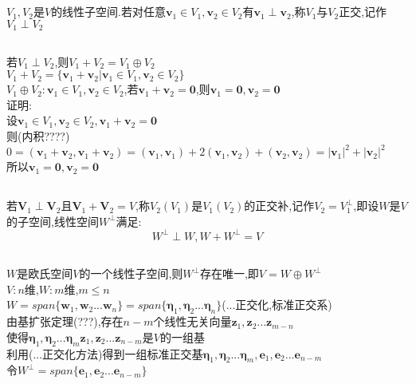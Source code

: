 \documentclass[11pt, a4paper, UTF8]{ctexart}
\begin{document}
\section{}
$V_1,V_2$是$V$的线性子空间.若对任意$\bm v_1\in V_1,\bm v_2\in V_2$有$\bm v_1\perp\bm v_2$,称$V_1$与$V_2$正交,记作$V_1\perp V_2$\\
\subsection{}
若$V_1\perp V_2$,则$V_1+V_2=V_1\oplus V_2$\\
$V_1+V_2=\{\bm v_1+\bm v_2|\bm v_1\in V_1,\bm v_2\in V_2\}$\\
$V_1\oplus V_2:\bm v_1\in V_1,\bm v_2\in V_2$,若$\bm v_1+\bm v_2=\bm0$,则$\bm v_1=\bm0,\bm v_2=\bm0$\\
证明:\\
设$\bm v_1\in V_1,\bm v_2\in V_2,\bm v_1+\bm v_2=\bm0$\\
则(内积????)$0=(\bm v_1+\bm v_2,\bm v_1+\bm v_2)=(\bm v_1,\bm v_1)+2(\bm v_1,\bm v_2)+(\bm v_2,\bm v_2)=|\bm v_1|^2+|\bm v_2|^2$\\
所以$\bm v_1=\bm0,\bm v_2=\bm0$\\
\subsection{}
若$\bm V_1\perp\bm V_2$且$\bm V_1+\bm V_2=V$,称$V_2(V_1)$是$V_1(V_2)$的正交补,记作$V_2=V_1^\perp$,即设$W$是$V$的子空间,线性空间$W^\perp$满足:\\
\[W^\perp\perp W,W+W^\perp=V\]
\subsection{}
$W$是欧氏空间$V$的一个线性子空间,则$W^\perp$存在唯一,即$V=W\oplus W^\perp$\\
$V:n$维,$W:m$维,$m\le n$\\
$W=span\{\bm w_1,\bm w_2...\bm w_n\}=span\{\bm\eta_1,\bm\eta_2...\bm\eta_n\}$(...正交化,标准正交系)\\
由基扩张定理(???),存在$n-m$个线性无关向量$\bm z_1,\bm z_2...\bm z_{m-n}$\\
使得$\bm\eta_1,\bm\eta_2...\bm\eta_m\bm z_1,\bm z_2...\bm z_{n-m}$是$V$的一组基\\
利用(...正交化方法)得到一组标准正交基$\bm\eta_1,\bm\eta_2...\bm\eta_m,\bm e_1,\bm e_2...\bm e_{n-m}$\\
令$W^{\perp}=span\{\bm e_1,\bm e_2...\bm e_{n-m}\}$\\
\end{document}
